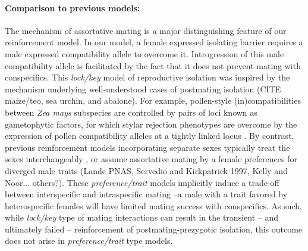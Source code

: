 \documentclass[11pt]{article}
\begin{document}
\paragraph{Comparison to previous models:}  
The mechanism of assortative mating is a major distinguishing feature of our reinforcement model. 
In our model, a female expressed isolating barrier requires a male expressed compatibility allele to overcome it.   %
Introgression of this male compatibility allele is facilitated by the fact that it does not prevent mating with conspecifics. 
This \textit{lock/key} model of reproductive isolation was inspired by the mechanism underlying well-understood cases of postmating isolation (CITE maize/teo, sea urchin, and abalone). 
For example, pollen-style (in)compatibilities between \textit{Zea mays} subspecies are controlled by pairs of loci known as gametophytic factors, for which stylar rejection phenotypes are overcome by the expression of pollen compatibility alleles at a tightly linked locus \citep{nelson1994}. 
By contrast, previous reinforcement models incorporating separate sexes typically treat the sexes interchangeably \citep[e.g. ][]{felsenstein1981}, or assume assortative mating by a female preferences for diverged male traits \citep{lande1981, servedio1997, kelly1996}(Lande PNAS, Servedio and Kirkpatrick 1997, Kelly and Noor... others?). 
These \textit{preference/trait} models implicitly induce a trade-off between interspecific and intraspecific mating --a male with a trait favored by heterospecific females will have limited mating success with conspecifics. 
As such, while \textit{lock/key} type of mating interactions can result in the transient -- and ultimately failed -- reinforcement of postmating-prezygotic isolation, this outcome does not arise in \textit{preference/trait}  type models.%
\end{document}
